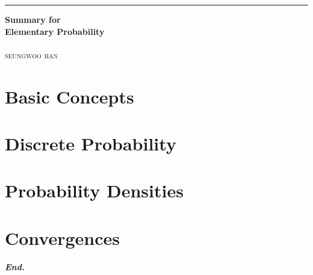 \documentclass[a4paper,12pt]{report}
\begin{document}

\begin{titlepage}
	\raggedleft

	\rule{1pt}{\textheight}
	\hspace{0.05\textwidth}
	\parbox[b]{0.75\textwidth}{

        {\Huge\bfseries Summary for\\[0.5\baselineskip] Elementary Probability}\\[2\baselineskip]
		\\[4\baselineskip]
		{\Large\textsc{seungwoo han}}

		\vspace{0.5\textheight}
	}
\end{titlepage}
\tableofcontents
\hypersetup{
    linkcolor=Maroon,
    filecolor=black,
    urlcolor=Maroon,
}
\pagebreak


\chapter{Basic Concepts}





\chapter{Discrete Probability}






\chapter{Probability Densities}








\chapter{Convergences}







\vfill
\begin{center}
    \textbf{\textit{End.}}
\end{center}
\end{document}
